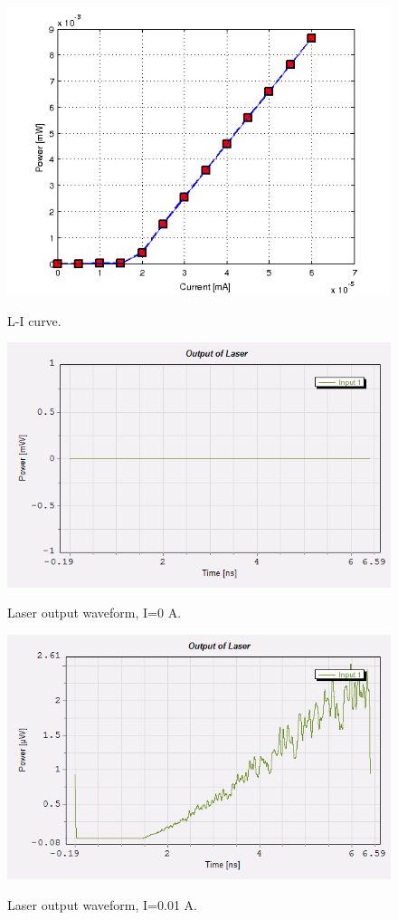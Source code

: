 \documentclass[a4paper,10pt]{report}
\begin{document}
\begin{figure}[!ht]
  \centering
  \includegraphics[width=12cm]{5_curve.png}\\
  \caption{L-I curve.}
  \label{5_curve}
\end{figure}

\begin{figure}[!ht]
  \centering
  \includegraphics[width=12cm]{5_2.png}\\
  \caption{Laser output waveform, I=0 A.}
  \label{5_1}
\end{figure}

\begin{figure}[!ht]
  \centering
  \includegraphics[width=12cm]{5_4.png}\\
  \caption{Laser output waveform, I=0.01 A.}
  \label{5_2}
\end{figure}
\end{document}
